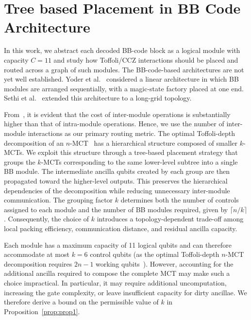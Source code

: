 \documentclass[sigconf]{acmart}
\newcommand{\siyi}[1]{%
        \textcolor{cyan}{\textbf{Siyi:} #1}%
    }
\newcommand{\siyi}[1]{}
\begin{document}
\section{Tree based Placement in BB Code Architecture}
\label{sec:1}
In this work, we abstract each decoded BB-code block as a logical module with capacity $C=11$ and study how Toffoli/CCZ interactions should be placed and routed across a graph of such modules. The BB-code-based architectures are not yet well established. Yoder et al.~\cite[Figure~2(a)]{tourdegross} considered a linear architecture in which BB modules are arranged sequentially, with a magic-state factory placed at one end. Sethi et al.~\cite{sethi2026optimizing} extended this architecture to a long-grid topology.

From~\cite[Table~2]{tourdegross}, it is evident that the cost of inter-module operations is substantially higher than that of intra-module operations. Hence, we use the number of inter-module interactions as our primary routing metric. The optimal Toffoli-depth decomposition of an $n$-MCT~\cite{dutta2025pra} has a hierarchical structure composed of smaller $k$-MCTs. We exploit this structure through a tree-based placement strategy that groups the $k$-MCTs corresponding to the same lower-level subtree into a single BB module. The intermediate ancilla qubits created by each group are then propagated toward the higher-level outputs. This preserves the hierarchical dependencies of the decomposition while reducing unnecessary inter-module communication. The grouping factor $k$ determines both the number of controls assigned to each module and the number of BB modules required, given by $\lceil  n/k \rceil$. Consequently, the choice of $k$ introduces a topology-dependent trade-off among local packing efficiency, communication distance, and residual ancilla capacity.

Each module has a maximum capacity of 11 logical qubits and can therefore accommodate at most $k=6$ control qubits (as the optimal Toffoli-depth $n$-MCT decomposition requires $2n-1$ working qubits~\cite{dutta2025pra}). However, accounting for the additional ancilla required to compose the complete MCT may make such a choice impractical. In particular, it may require additional uncomputation, increasing the gate complexity, or leave insufficient capacity for dirty ancillae. We therefore derive a bound on the permissible value of $k$ in Proposition~\ref{prop:prop1}.
\end{document}
